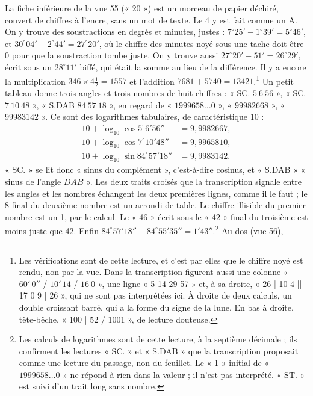 \documentclass[11pt,a4paper]{article}
\begin{document}
La fiche inférieure de la vue 55 (« 20 ») est un morceau de papier déchiré,
couvert de chiffres à l'encre, sans un mot de texte. Le 4 y est fait comme un
A. On y trouve des soustractions en degrés et minutes, justes :
\(7^\circ25'-1^\circ39'=5^\circ46'\), et \(30^\circ04'-2^\circ44'=27^\circ20'\),
où le chiffre des minutes noyé sous une tache doit être 0 pour que la
soustraction tombe juste. On y trouve aussi
\(27^\circ20'-51'=26^\circ29'\), écrit sous un \(28^\circ11'\) biffé, qui était
la somme au lieu de la différence. Il y a encore la multiplication
\(346\times4\frac12=1557\) et l'addition \(7681+5740=13421\).\footnote{Les
vérifications sont de cette lecture, et c'est par elles que le chiffre noyé
est rendu, non par la vue. Dans la transcription figurent aussi une colonne
« \(60'\,0''\) / \(10'\,14\) / \(16\ 0\) », une ligne « 5 14 29 57 » et, à sa
droite, « 26 | 10 4 ||| 17 0 9 | 26 », qui ne sont pas interprétées ici. À
droite de deux calculs, un double croissant barré, qui a la forme du signe de
la lune. En bas à droite, tête-bêche, « 100 | 52 / 1001 », de lecture douteuse.}
Un petit tableau donne trois angles et trois nombres de huit chiffres :
« SC. \(5\ 6\ 56\) », « SC. \(7\ 10\ 48\) », « S.DAB \(84\ 57\ 18\) », en regard
de « \(1999658\ldots0\) », « \(99982668\) », « \(99983142\) ». Ce sont des
logarithmes tabulaires, de caractéristique 10 :
\[
\begin{aligned}
10+\log_{10}\cos5^\circ6'56''&=9{,}9982667,\\
10+\log_{10}\cos7^\circ10'48''&=9{,}9965810,\\
10+\log_{10}\sin84^\circ57'18''&=9{,}9983142 .
\end{aligned}
\]
« SC. » se lit donc « sinus du complément », c'est-à-dire cosinus, et
« S.DAB » « sinus de l'angle \(DAB\) ». Les deux traits croisés que la
transcription signale entre les angles et les nombres échangent les deux
premières lignes, comme il le faut ; le 8 final du deuxième nombre est un
arrondi de table. Le chiffre illisible du premier nombre est
un 1, par le calcul. Le « 46 » écrit sous le « 42 » final du troisième est
moins juste que 42. Enfin \(84^\circ57'18''-84^\circ55'35''=1'43''\).\footnote{Les
calculs de logarithmes sont de cette lecture, à la septième décimale ; ils
confirment les lectures « SC. » et « S.DAB » que la transcription proposait
comme une lecture du passage, non du feuillet. Le « 1 » initial de
« \(1999658\ldots0\) » ne répond à rien dans la valeur ; il n'est pas
interprété. « ST. » est suivi d'un trait long sans nombre.} Au dos (vue 56),
\end{document}
